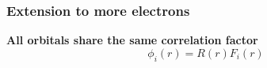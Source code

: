 \begin{frame}
\frametitle{Extension to more electrons}
\centering
\textbf{All orbitals share the same correlation factor}
\begin{equation}
    \nonumber
    \phi_i(r) = R(r) F_i(r)
\end{equation}

\end{frame}

